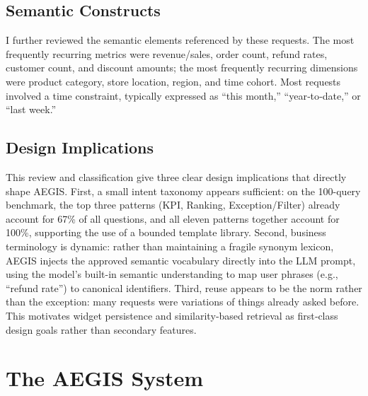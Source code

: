 \documentclass[11pt]{article}
\begin{document}
\subsection{Semantic Constructs}
I further reviewed the semantic elements referenced by these requests. The most frequently recurring metrics were revenue/sales, order count, refund rates, customer count, and discount amounts; the most frequently recurring dimensions were product category, store location, region, and time cohort. Most requests involved a time constraint, typically expressed as ``this month,'' ``year‑to‑date,'' or ``last week.''

\subsection{Design Implications}
This review and classification give three clear design implications that directly shape AEGIS. First, a small intent taxonomy appears sufficient: on the 100-query benchmark, the top three patterns (KPI, Ranking, Exception/Filter) already account for 67\% of all questions, and all eleven patterns together account for 100\%, supporting the use of a bounded template library. Second, business terminology is dynamic: rather than maintaining a fragile synonym lexicon, AEGIS injects the approved semantic vocabulary directly into the LLM prompt, using the model's built-in semantic understanding to map user phrases (e.g., ``refund rate'') to canonical identifiers. Third, reuse appears to be the norm rather than the exception: many requests were variations of things already asked before. This motivates widget persistence and similarity‑based retrieval as first‑class design goals rather than secondary features.

\section{The AEGIS System}
\end{document}
